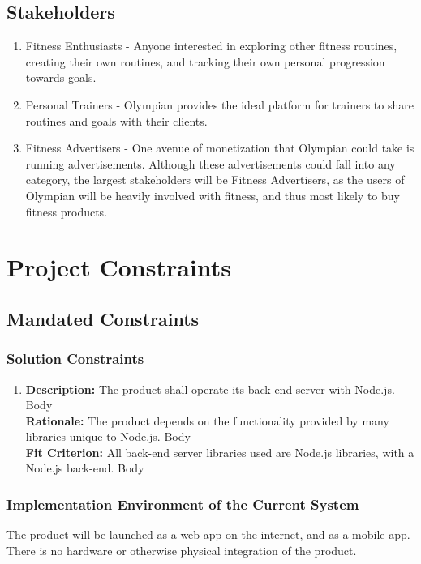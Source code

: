 \documentclass[12pt]{article}
\begin{document}
\subsection{Stakeholders}
\begin{enumerate}
	\item Fitness Enthusiasts - Anyone interested in exploring other fitness routines, creating their own routines, and tracking their own personal progression towards goals.
	\item Personal Trainers - Olympian provides the ideal platform for trainers to share routines and goals with their clients.
	\item Fitness Advertisers - One avenue of monetization that Olympian could take is running advertisements. Although these advertisements could fall into any category, the largest stakeholders will be Fitness Advertisers,
	as the users of Olympian will be heavily involved with fitness, and thus most likely to buy fitness products.
\end{enumerate} 

\section{Project Constraints}
\subsection{Mandated Constraints} 
\subsubsection{Solution Constraints}
\begin{enumerate}
	\item
	\textbf{Description: } The product shall operate its back-end server with Node.js.
	Body \\
	\textbf{Rationale: } The product depends on the functionality provided by many libraries unique to Node.js.
	Body \\
	\textbf{Fit Criterion: } All back-end server libraries used are Node.js libraries, with a Node.js back-end.
	Body \\
\end{enumerate}
\subsubsection{Implementation Environment of the Current System}
The product will be launched as a web-app on the internet, and as a mobile app. There is no hardware or otherwise physical integration of the product.
\end{document}
